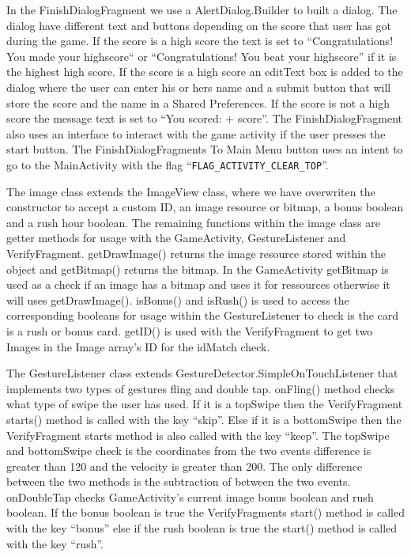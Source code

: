 In the FinishDialogFragment we use a AlertDialog.Builder to built a dialog. The dialog have different text and buttons depending on the score that user has got during the game. If the score is a high score the text is set to “Congratulations! You made your highscore“ or “Congratulations! You beat your highscore” if it is the highest high score. If the score is a high score an editText box is added to the dialog where the user can enter his or hers name and a submit button that will store the score and the name in a Shared Preferences. If the score is not a high score the message text is set to “You scored: + score”.
The FinishDialogFragment also uses an interface to interact with the game activity if the user presses the start button. The FinishDialogFragments To Main Menu button uses an intent to go to the MainActivity with the flag “\verb|FLAG_ACTIVITY_CLEAR_TOP|”. \newline

The image class extends the ImageView class, where we have overwriten the constructor to accept a custom ID, an image resource or bitmap, a bonus boolean and a rush hour boolean. The remaining functions within the image class are getter methods for usage with the GameActivity, GestureListener and VerifyFragment. getDrawImage() returns the image resource stored within the object and getBitmap() returns the bitmap. In the GameActivity getBitmap is used as a check if an image has a bitmap and uses it for ressources otherwise it will uses getDrawImage(). isBonus() and isRush() is used to access the corresponding booleans for usage within the GestureListener to check is the card is a rush or bonus card. getID() is used with the VerifyFragment to get two Images in the Image array’s ID for the idMatch check. \newline

The GestureListener class extends GestureDetector.SimpleOnTouchListener that implements two types of gestures fling and double tap. onFling() method checks what type of swipe the user has used. If it is a topSwipe then the VerifyFragment starts() method is called with the key “skip”. Else if it is a bottomSwipe then the VerifyFragment starts method is also called with the key “keep”. The topSwipe and bottomSwipe check is the coordinates from the two events difference is greater than 120 and the velocity is greater than 200. The only difference between the two methods is the subtraction of between the two events. onDoubleTap checks GameActivity’s current image bonus boolean and rush boolean. If the bonus boolean is true the VerifyFragments start() method is called with the key “bonus” else if the rush boolean is true the start() method is called with the key “rush”. \newline

